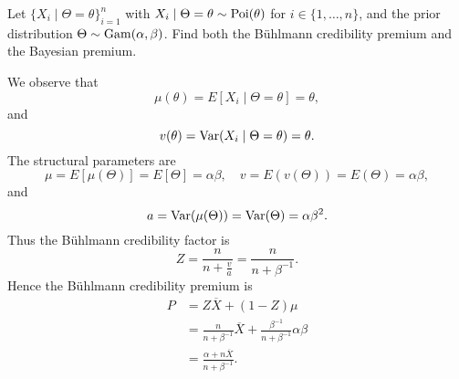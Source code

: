 \documentclass[notoc,notitlepage]{tufte-book}
\begin{document}
\begin{eg}
  Let $\{X_i \mid \Theta = \theta\}_{i=1}^{n}$ with $X_i \mid \Theta = \theta
  \sim \operatorname{Poi}(\theta)$ for $i \in \{ 1, \ldots, n \}$, and the prior distribution
  $\Theta \sim \operatorname{Gam}(\alpha, \beta)$. Find both the B\"{u}hlmann credibility
  premium and the Bayesian premium.
\end{eg}

\begin{solution}
   We observe that
  \begin{equation*}
    \mu(\theta) = E[X_i \mid \Theta = \theta] = \theta,
  \end{equation*}
  and
  \begin{equation*}
    v(\theta) = \operatorname{Var}(X_i \mid \Theta = \theta) = \theta.
  \end{equation*}
  The structural parameters are
  \begin{equation*}
    \mu = E[\mu(\Theta)] = E[\Theta] = \alpha\beta,\quad
    v = E(v(\Theta)) = E(\Theta) = \alpha\beta,
  \end{equation*}
  and
  \begin{equation*}
    a = \operatorname{Var}(\mu(\Theta)) = \operatorname{Var}(\Theta) = \alpha\beta^2.
  \end{equation*}
  Thus the B\"{u}hlmann credibility factor is
  \begin{equation*}
    Z = \frac{n}{n + \frac{v}{a}} = \frac{n}{n + \beta^{-1}}.
  \end{equation*}
  Hence the B\"{u}hlmann credibility premium is
  \begin{align*}
    P &= Z \overline{X} + (1 - Z) \mu \\
      &= \frac{n}{n + \beta^{-1}} \overline{X} + \frac{\beta^{-1}}{n +
        \beta^{-1}} \alpha\beta \\
      &= \frac{\alpha + n \overline{X}}{n + \beta^{-1}}.
  \end{align*}


\end{solution}
\end{document}
